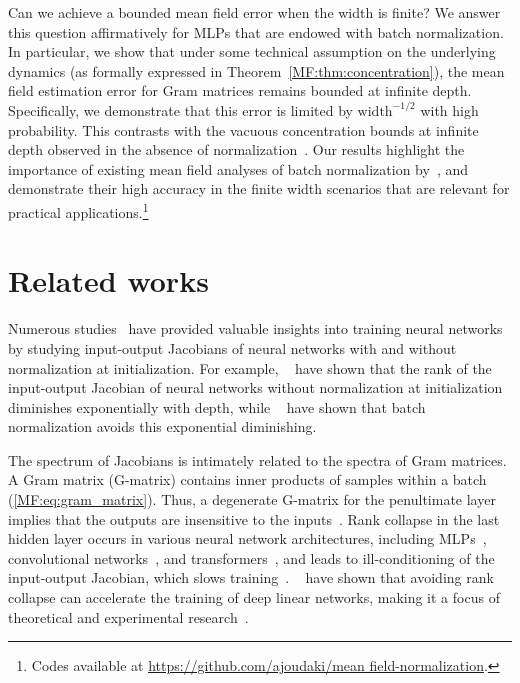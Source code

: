 Can we achieve a bounded mean field error when the width is finite? We answer this question affirmatively for MLPs that are endowed with batch normalization. In particular, we show that under some technical assumption on the underlying dynamics (as formally expressed in Theorem~\ref{MF:thm:concentration}), the mean field estimation error for Gram matrices remains bounded at infinite depth. Specifically, we demonstrate that this error is limited by $\text{width}^{-1/2}$ with high probability. This contrasts with the vacuous concentration bounds at infinite depth observed in the absence of normalization~\cite{li2022neural}. Our results highlight the importance of existing mean field analyses of batch normalization by~\citet{yang2018a}, and demonstrate their high accuracy in the finite width scenarios that are relevant for practical applications.\footnote{Codes available at \url{https://github.com/ajoudaki/mean field-normalization}.}


\section{Related works}
Numerous studies~\cite{saxe2013exact,feng2022rank,yang2018a} have provided valuable insights into training neural networks by studying input-output Jacobians of neural networks with and without normalization at initialization. For example, ~\citet{feng2022rank} have shown that the rank of the input-output Jacobian of neural networks without normalization at initialization diminishes exponentially with depth, while ~\citet{yang2018a} have shown that batch normalization avoids this exponential diminishing. 

The spectrum of Jacobians is intimately related to the spectra of Gram matrices. 
A Gram matrix (G-matrix) contains inner products of samples within a batch (\eqref{MF:eq:gram_matrix}). Thus, a degenerate G-matrix for the penultimate layer implies that the outputs are insensitive to the inputs~\cite{feng2022rank,li2022neural}.  
Rank collapse in the last hidden layer occurs in various neural network architectures, including MLPs~\cite{saxe2013exact}, convolutional networks~\cite{daneshmand2020batch}, and transformers~\cite{dong2021attention}, and leads to ill-conditioning of the input-output Jacobian, which slows training~\cite{daneshmand2021batch,pennington2018emergence,yang2018a}. ~\citet{saxe2013exact} have shown that avoiding rank collapse can accelerate the training of deep linear networks, making it a focus of theoretical and experimental research~\cite{pennington2018emergence,daneshmand2020batch,daneshmand2021batch}.


